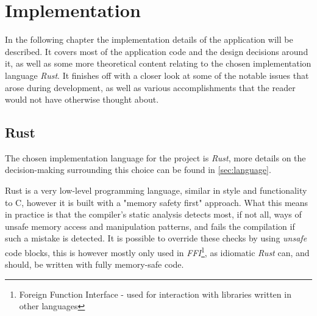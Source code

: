 \section{Implementation}
    In the following chapter the implementation details of the application will be described. It covers most of the application code and the design decisions around it, as well as some more theoretical content relating to the chosen implementation language \textit{Rust}. It finishes off with a closer look at some of the notable issues that arose during development, as well as various accomplishments that the reader would not have otherwise thought about.

    \subsection{Rust}
        The chosen implementation language for the project is \textit{Rust}, more details on the decision-making surrounding this choice can be found in \autoref{sec:language}.
        
        Rust is a very low-level programming language, similar in style and functionality to C, however it is built with a "memory safety first" approach. What this means in practice is that the compiler's static analysis detects most, if not all, ways of unsafe memory access and manipulation patterns, and fails the compilation if such a mistake is detected. It is possible to override these checks by using \textit{unsafe} code blocks, this is however mostly only used in \textit{FFI}\footnote{Foreign Function Interface - used for interaction with libraries written in other languages}, as idiomatic \textit{Rust} can, and should, be written with fully memory-safe code.
        
